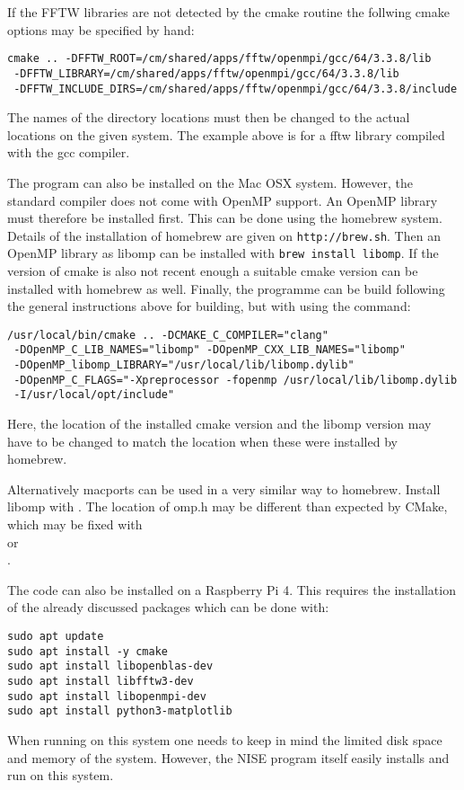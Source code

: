 If the FFTW libraries are not detected by the cmake routine the follwing cmake options may be specified by hand:
\begin{lstlisting}[style=mystyle]
cmake .. -DFFTW_ROOT=/cm/shared/apps/fftw/openmpi/gcc/64/3.3.8/lib
 -DFFTW_LIBRARY=/cm/shared/apps/fftw/openmpi/gcc/64/3.3.8/lib
 -DFFTW_INCLUDE_DIRS=/cm/shared/apps/fftw/openmpi/gcc/64/3.3.8/include
\end{lstlisting}
The names of the directory locations must then be changed to the actual locations on the given system.  The example above is for a fftw library compiled with the gcc compiler.

The program can also be installed on the Mac OSX system. However, the standard compiler does not come with OpenMP support. An OpenMP library must therefore be installed first. This can be done using the homebrew system. Details of the installation of homebrew are given on \texttt{http://brew.sh}. Then an OpenMP library as libomp can be installed with \texttt{brew install libomp}. If the version of cmake is also not recent enough a suitable cmake version can be installed with homebrew as well. Finally, the programme can be build following the general instructions above for building, but with using the command:
\begin{lstlisting}[style=mystyle]
/usr/local/bin/cmake .. -DCMAKE_C_COMPILER="clang"
 -DOpenMP_C_LIB_NAMES="libomp" -DOpenMP_CXX_LIB_NAMES="libomp"
 -DOpenMP_libomp_LIBRARY="/usr/local/lib/libomp.dylib"
 -DOpenMP_C_FLAGS="-Xpreprocessor -fopenmp /usr/local/lib/libomp.dylib
 -I/usr/local/opt/include"
\end{lstlisting}
Here, the location of the installed cmake version and the libomp version may have to be changed to match the location when these were installed by homebrew.

Alternatively macports can be used in a very similar way to homebrew. Install libomp with . The location of omp.h may be different than expected by CMake, which may be fixed with\\  or\\ .

The code can also be installed on a Raspberry Pi 4. This requires the installation of the already discussed packages which can be done with:
\begin{lstlisting}[style=mystyle]
sudo apt update
sudo apt install -y cmake
sudo apt install libopenblas-dev
sudo apt install libfftw3-dev
sudo apt install libopenmpi-dev
sudo apt install python3-matplotlib
\end{lstlisting}
When running on this system one needs to keep in mind the limited disk space and memory of the system. However, the NISE program itself easily installs and run on this system. 

